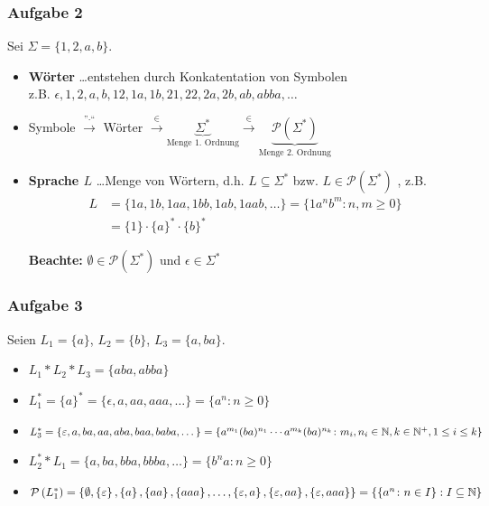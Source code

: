 \documentclass{beamer}
\begin{document}
\begin{frame} \frametitle{Aufgabe 2}
	Sei $\Sigma = \{1,2,a,b\}$. \pause
	\begin{itemize}[leftmargin=*]
		\item \textbf{Wörter}
		\dots entstehen durch Konkatentation von Symbolen \\
		z.B. $\epsilon, 1, 2, a,b,12,1a,1b,21,22,2a,2b,ab,abba,\dots$
		
		\item Symbole $\overset{\text{''}\cdot\text{``}}{\longrightarrow}$ Wörter $\overset{\in}{\longrightarrow} \underbrace{\Sigma^\ast}_{\text{Menge 1. Ordnung}} \overset{\in}{\longrightarrow} \underbrace{\mathcal{P}(\Sigma^\ast)}_{\text{Menge 2. Ordnung}}$
		
		\item \textbf{Sprache $L$}
		\dots Menge von Wörtern, d.h. $L \subseteq \Sigma^\ast$ bzw. $L \in \mathcal{P}(\Sigma^\ast)$ , z.B.
		\begin{equation*}
		\begin{aligned}
		L &= \{1a,1b,1aa,1bb,1ab,1aab, \dots \} 
		= \{1 a^n b^m \colon n,m \ge 0 \} \\
		&= \{1\} \cdot \{a\}^\ast \cdot \{b\}^\ast
		\end{aligned}
		\end{equation*}
		
		\textbf{Beachte:} $\emptyset \in \mathcal{P}(\Sigma^\ast)$ und $\epsilon \in \Sigma^\ast$
	\end{itemize}
	
\end{frame}

\begin{frame} \frametitle{Aufgabe 3}
	Seien $L_1 = \{a\}$, $L_2 = \{b\}$, $L_3 = \{a,ba\}$.
	
	\begin{itemize}[leftmargin=*]
		\item $L_1 * L_2 * L_3 = \{aba,abba\}$
		\item $L_1^\ast = \{a\}^\ast = \{\epsilon,a,aa,aaa, \dots\} = \{a^n \colon n \ge 0\}$
	 	\item $L_3^\ast = \{\varepsilon, a,ba,aa,aba,baa,baba,\dots\} = \{a^{m_1}(ba)^{n_1} \cdots a^{m_k}(ba)^{n_k} \colon m_i, n_i \in \mathbb{N}, k \in \mathbb{N}^+, 1 \le i \le k\}$
	 	\item $L_2^\ast * L_1 = \{a,ba,bba,bbba,\dots\} = \{b^n a \colon n \ge 0\}$
	 	\item $\mathcal{P}\left( L_1^\ast \right) = \left\{ \emptyset, \left\{ \varepsilon \right\}, \left\{ a \right\}, \left\{ aa \right\}, \left\{ aaa \right\}, \dots , \left\{ \varepsilon, a \right\}, \left\{ \varepsilon,aa \right\}, \left\{ \varepsilon,aaa \right\} \right\} = \left\{ \left\{ a^n \colon n \in I \right\} : I \subseteq \mathbb{N} \right\}$
	\end{itemize}
\end{frame}
\end{document}
